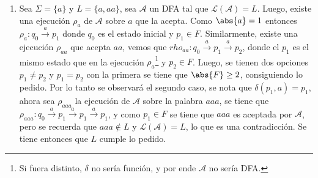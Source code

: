 \documentclass{homework}
\begin{document}
\begin{p2}
\begin{sol}[2]
\begin{enumerate}
            \item Sea \(\Sigma=\{a\}\) y \(L=\{a,aa\}\), sea \(\mathcal{A}\) un DFA tal que \(\mathcal{L}(\mathcal{A})=L\). Luego, existe una ejecución \(\rho_a\) de \(\mathcal{A}\) sobre \(a\) que la acepta. Como \(\abs{a}=1\) entonces \(\rho_a:q_0\xrightarrow{a}p_1\) donde \(q_0\) es el estado inicial y \(p_1\in F\). Similarmente, existe una ejecución \(\rho_{aa}\) que acepta \(aa\), vemos que \(rho_{aa}:q_0\xrightarrow{a}p_1\xrightarrow{a}p_2\), donde el \(p_1\) es el mismo estado que en la ejecución \(\rho_a\)\footnote{Si fuera distinto, \(\delta\) no sería función, y por ende \(\mathcal{A}\) no sería DFA.} y \(p_2\in F\). Luego, se tienen dos opciones \(p_1\neq p_2\) y \(p_1=p_2\) con la primera se tiene que \(\abs{F}\geq2\), consiguiendo lo pedido. Por lo tanto se observará el segundo caso, se nota que \(\delta(p_1,a)=p_1\), ahora sea \(\rho_{aaa}\) la ejecución de \(\mathcal{A}\) sobre la palabra \(aaa\), se tiene que \(\rho_{aaa}:q_0\xrightarrow{a}p_1\xrightarrow{a}p_1\xrightarrow{a}p_1\), y como \(p_1\in F\) se tiene que \(aaa\) es aceptada por \(\mathcal{A}\), pero se recuerda que \(aaa\notin L\) y \(\mathcal{L}(\mathcal{A})=L\), lo que es una contradicción. Se tiene entonces que \(L\) cumple lo pedido.
        \end{enumerate}
    \end{sol}
\end{p2}
\end{document}
